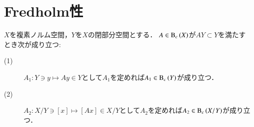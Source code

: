 \section{Fredholm性}

	\begin{screen}
		\begin{lem}[商空間のコンパクト作用素]
			$X$を複素ノルム空間，$Y$を$X$の閉部分空間とする．
			$A \in \mathrm{B}_c\left(X\right) $が$AY \subset Y$を満たすとき次が成り立つ:
			\begin{description}
				\item[(1)] $A_1:Y \ni y \longmapsto A y \in Y$として$A_1$を定めれば$A_1 \in \mathrm{B}_c\left(Y\right) $が成り立つ．
				\item[(2)] $A_2:X/Y \ni [x] \longmapsto [Ax] \in X/Y$として$A_2$を定めれば$A_2 \in \mathrm{B}_c\left(X/Y\right) $が成り立つ．
			\end{description}
			\label{thm:compact_operator_on_quotient_normed_space}
		\end{lem}
	\end{screen}
	
